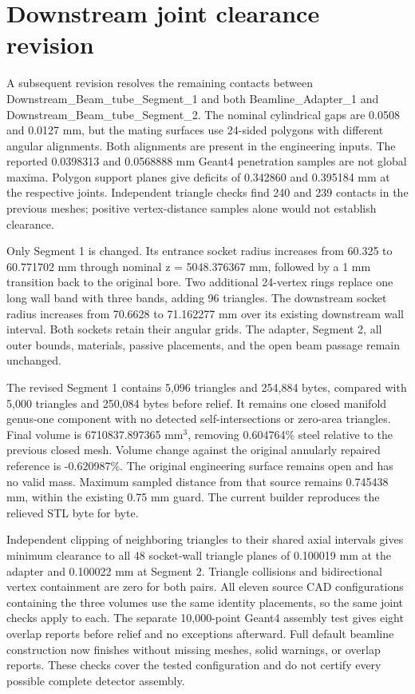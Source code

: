 \FloatBarrier
\section{Downstream joint clearance revision}
\label{sec:downstream-joints}

A subsequent revision resolves the remaining contacts between Downstream\_Beam\_tube\_Segment\_1 and both
Beamline\_Adapter\_1 and Downstream\_Beam\_tube\_Segment\_2. The nominal cylindrical gaps are 0.0508 and
0.0127 mm, but the mating surfaces use 24-sided polygons with different angular alignments. Both alignments
are present in the engineering inputs. The reported 0.0398313 and 0.0568888 mm Geant4 penetration samples
are not global maxima. Polygon support planes give deficits of 0.342860 and 0.395184 mm at the respective
joints. Independent triangle checks find 240 and 239 contacts in the previous meshes; positive
vertex-distance samples alone would not establish clearance.

Only Segment 1 is changed. Its entrance socket radius increases from 60.325 to 60.771702 mm through nominal
z = 5048.376367 mm, followed by a 1 mm transition back to the original bore. Two additional 24-vertex rings
replace one long wall band with three bands, adding 96 triangles. The downstream socket radius increases
from 70.6628 to 71.162277 mm over its existing downstream wall interval. Both sockets retain their angular
grids. The adapter, Segment 2, all outer bounds, materials, passive placements, and the open beam passage
remain unchanged.

The revised Segment 1 contains 5,096 triangles and 254,884 bytes, compared with 5,000 triangles and 250,084
bytes before relief. It remains one closed manifold genus-one component with no detected self-intersections
or zero-area triangles. Final volume is 6710837.897365 mm$^3$, removing 0.604764\% steel relative to the
previous closed mesh. Volume change against the original annularly repaired reference is -0.620987\%. The
original engineering surface remains open and has no valid mass. Maximum sampled distance from that source
remains 0.745438 mm, within the existing 0.75 mm guard. The current builder reproduces the relieved STL byte
for byte.

Independent clipping of neighboring triangles to their shared axial intervals gives minimum clearance to all
48 socket-wall triangle planes of 0.100019 mm at the adapter and 0.100022 mm at Segment 2. Triangle
collisions and bidirectional vertex containment are zero for both pairs. All eleven source CAD
configurations containing the three volumes use the same identity placements, so the same joint checks apply
to each. The separate 10,000-point Geant4 assembly test gives eight overlap reports before relief and no
exceptions afterward. Full default beamline construction now finishes without missing meshes, solid
warnings, or overlap reports. These checks cover the tested configuration and do not certify every possible
complete detector assembly.


